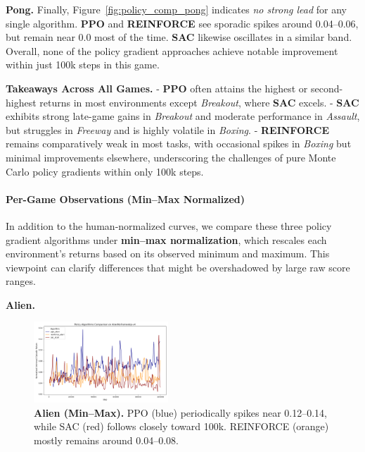 \noindent
\textbf{Pong.} Finally, Figure~\ref{fig:policy_comp_pong} indicates \emph{no strong lead} for any single algorithm. \textbf{PPO} and \textbf{REINFORCE} see sporadic spikes around 0.04--0.06, but remain near 0.0 most of the time. \textbf{SAC} likewise oscillates in a similar band. Overall, none of the policy gradient approaches achieve notable improvement within just 100k steps in this game.

\smallskip
\noindent
\textbf{Takeaways Across All Games.}  
- \textbf{PPO} often attains the highest or second-highest returns in most environments except \emph{Breakout}, where \textbf{SAC} excels.  
- \textbf{SAC} exhibits strong late-game gains in \emph{Breakout} and moderate performance in \emph{Assault}, but struggles in \emph{Freeway} and is highly volatile in \emph{Boxing}.  
- \textbf{REINFORCE} remains comparatively weak in most tasks, with occasional spikes in \emph{Boxing} but minimal improvements elsewhere, underscoring the challenges of pure Monte Carlo policy gradients within only 100k steps.

\paragraph{Per-Game Observations (Min--Max Normalized)}

In addition to the human‐normalized curves, we compare these three policy gradient algorithms under \textbf{min--max normalization}, which rescales each environment’s returns based on its observed minimum and maximum. This viewpoint can clarify differences that might be overshadowed by large raw score ranges.

\medskip

\textbf{Alien.}
\begin{figure}[htbp]
	\centering
	\includegraphics[width=0.45\textwidth]{figures/policy_comparison/charts_episodic_return_minmax_comparison_AlienNoFrameskip-v4_policy.png}
	\caption{\textbf{Alien (Min--Max).} PPO (blue) periodically spikes near 0.12--0.14, while SAC (red) follows closely toward 100k. REINFORCE (orange) mostly remains around 0.04--0.08.}
	\label{fig:policy_minmax_alien}
\end{figure}

